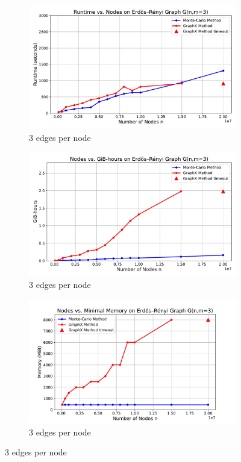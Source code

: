 \begin{figure}[H]
    \centering
    \begin{subfigure}[t]{0.47\linewidth}
        \centering
        \includegraphics[width=\linewidth]{images/plots/ER_3edg/runtime_vs_nodes_er_graph_3_edges.pdf}
        \caption{3 edges per node}
        \label{fig:3run}
    \end{subfigure}
    \begin{subfigure}[t]{0.47\linewidth}
        \centering
        \includegraphics[width=\linewidth]{images/plots/ER_3edg/gbhrs_nodes_er_graph_3edges.pdf}
        \caption{3 edges per node}
        \label{fig:3cost}
    \end{subfigure}
    \begin{subfigure}[t]{0.47\linewidth}
        \centering
        \includegraphics[width=\linewidth]{images/plots/ER_3edg/nodes_vs_mvm_3edges.pdf}
        \caption{3 edges per node}
        \label{fig:3mvm}
    \end{subfigure}
\end{figure}

